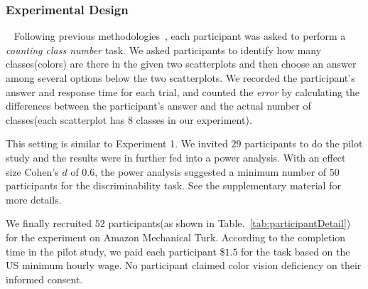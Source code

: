 \subsubsection{Experimental Design}
\
\newline
\vspace{.3em}
Following previous methodologies~\cite{Wang2018, Lu21}, each participant was asked to perform a \emph{counting class number} task.  We asked participants to identify how many classes(colors) are there in the given two scatterplots and then choose an answer among several options below the two scatterplots. We recorded the participant's answer and response time for each trial, and counted the \emph{error}  by calculating the differences between the participant's answer and the actual number of classes(each scatterplot has $8$ classes in our experiment). %


\vspace{.3em}
This setting is similar to Experiment 1. We invited $29$ participants to do the pilot study and the results were in further fed into a power analysis. With an effect size Cohen's $d$ of $0.6$, the power analysis suggested a minimum number of $50$ participants for the discriminability task. See the supplementary material for more details.

\vspace{.3em}
We finally recruited $52$ participants(as shown in Table.~\ref{tab:participantDetail}) for the experiment on Amazon Mechanical Turk.
According to the completion time in the pilot study, we paid each participant \$$1.5$ for the task based on the US minimum hourly wage.
No participant claimed color vision deficiency on their informed consent.

